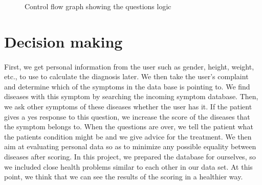 \begin{figure}[H]
	\caption{Control flow graph showing the questions logic}
	\label{cfg_logic}
\end{figure}

\section{Decision making}

\paragraph{}
First,	we	get	personal	information	from	the	user	such	as	gender,	height,	weight,	etc.,	to	use	to	calculate	the	diagnosis	later.	We	then	take	the	user's	complaint	and	determine	which	of	the	symptoms	in	the	data	base	is	pointing	to.	We	find	diseases	with	this	symptom	by	searching	the	incoming	symptom	database.	Then,	we	ask	other	symptoms	of	these	diseases	whether	the	user	has	it.	If	the	patient	gives a	yes	response to	this	question,	we	increase the score	of the	diseases	that	the	symptom	belongs	to.	When	the	questions	are	over,	we	tell	the	patient	what	the	patients condition might be	and	we	give	advice	for	the	treatment.	We	then	aim	at	evaluating	personal	data	so	as	to	minimize	any	possible	equality	between	diseases	after	scoring.	In	this	project,	we	prepared	the	database	for	ourselves,	so	we	included	close	health	problems	similar	to	each	other	in	our	data	set.	At	this	point,	we	think	that	we	can	see	the	results	of	the	scoring	in	a	healthier	way.	